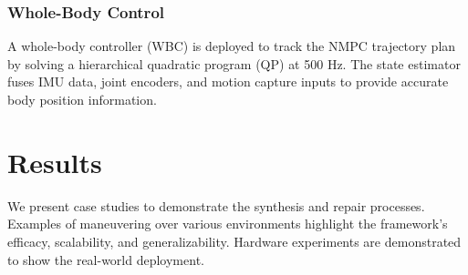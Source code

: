 \documentclass[letterpaper, 10 pt, conference]{ieeeconf}
\begin{document}

\subsubsection{Whole-Body Control}
A whole-body controller (WBC) is deployed to track the NMPC trajectory plan by solving a hierarchical quadratic program (QP) \cite{herzog2016momentum} at 500 Hz. The state estimator fuses IMU data, joint encoders, and motion capture inputs to provide accurate body position information.

\section{Results}\label{sec:experiments}
We present case studies to demonstrate the synthesis and repair processes. Examples of maneuvering over various environments highlight the framework's efficacy, scalability, and generalizability. Hardware experiments are demonstrated to show the real-world deployment.
\end{document}

